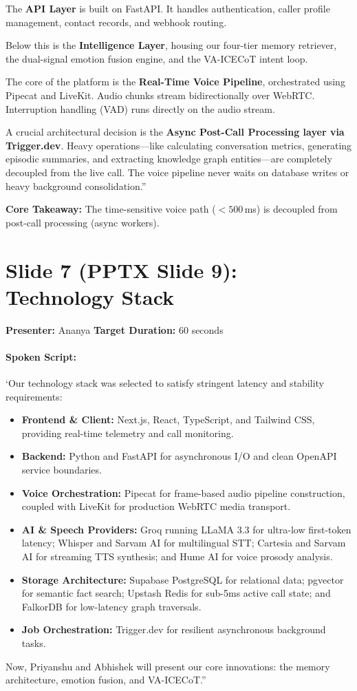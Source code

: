 \documentclass[11pt,a4paper]{article}
\begin{document}
The \textbf{API Layer} is built on FastAPI. It handles authentication, caller profile management, contact records, and webhook routing.

Below this is the \textbf{Intelligence Layer}, housing our four-tier memory retriever, the dual-signal emotion fusion engine, and the VA-ICECoT intent loop.

The core of the platform is the \textbf{Real-Time Voice Pipeline}, orchestrated using Pipecat and LiveKit. Audio chunks stream bidirectionally over WebRTC. Interruption handling (VAD) runs directly on the audio stream.

A crucial architectural decision is the \textbf{Async Post-Call Processing layer via Trigger.dev}. Heavy operations—like calculating conversation metrics, generating episodic summaries, and extracting knowledge graph entities—are completely decoupled from the live call. The voice pipeline never waits on database writes or heavy background consolidation.''

\noindent\textbf{Core Takeaway:} The time-sensitive voice path ($<500$\,ms) is decoupled from post-call processing (async workers).

\newpage

\section*{Slide 7 (PPTX Slide 9): Technology Stack}
\textbf{Presenter:} Ananya \hfill \textbf{Target Duration:} 60 seconds

\paragraph{Spoken Script:}
`Our technology stack was selected to satisfy stringent latency and stability requirements:
\begin{itemize}
    \item \textbf{Frontend \& Client:} Next.js, React, TypeScript, and Tailwind CSS, providing real-time telemetry and call monitoring.
    \item \textbf{Backend:} Python and FastAPI for asynchronous I/O and clean OpenAPI service boundaries.
    \item \textbf{Voice Orchestration:} Pipecat for frame-based audio pipeline construction, coupled with LiveKit for production WebRTC media transport.
    \item \textbf{AI \& Speech Providers:} Groq running LLaMA 3.3 for ultra-low first-token latency; Whisper and Sarvam AI for multilingual STT; Cartesia and Sarvam AI for streaming TTS synthesis; and Hume AI for voice prosody analysis.
    \item \textbf{Storage Architecture:} Supabase PostgreSQL for relational data; pgvector for semantic fact search; Upstash Redis for sub-5ms active call state; and FalkorDB for low-latency graph traversals.
    \item \textbf{Job Orchestration:} Trigger.dev for resilient asynchronous background tasks.
\end{itemize}
Now, Priyanshu and Abhishek will present our core innovations: the memory architecture, emotion fusion, and VA-ICECoT.''
\end{document}
